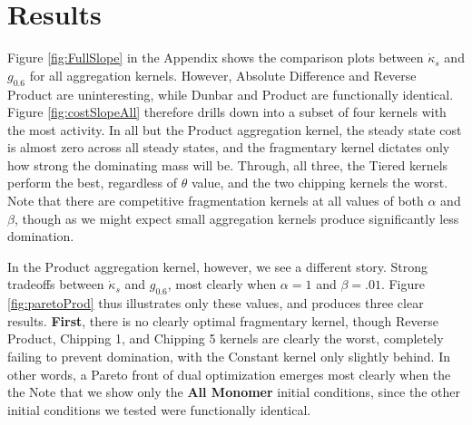 \documentclass[fleqn,10pt]{wlscirep}
\begin{document}
\vspace{0.5em}







\section{Results\label{sec:results}}
Figure \ref{fig:FullSlope} in the Appendix shows the comparison plots between $ \dot{\kappa}_s $ and $ g_{0.6} $ for all aggregation kernels.
However, \textcolor{abs}{Absolute Difference } and \textcolor{rprod}{Reverse Product} are uninteresting, while \textcolor{dunbar}{Dunbar} and \textcolor{product}{Product} are functionally identical.
Figure \ref{fig:costSlopeAll} therefore drills down into a subset of four kernels with the most activity.
In all but the  \textcolor{product}{Product}  aggregation kernel, the steady state cost is almost zero across all steady states, and the fragmentary kernel dictates only how strong the dominating mass will be.
Through, all three, the Tiered kernels perform the best, regardless of $ \theta $ value, and the two chipping kernels the worst.
Note that there are competitive fragmentation kernels at all values of both $ \alpha $ and $ \beta $, though as we might expect small aggregation kernels produce significantly less domination.


In the \textcolor{product}{Product} aggregation kernel, however, we see a different story.
Strong tradeoffs between $ \dot{\kappa}_s $ and $ g_{0.6} $, most clearly when $ \alpha = 1 $ and $ \beta = .01 $.
Figure \ref{fig:paretoProd} thus illustrates only these values, and produces three clear results.
\textbf{First}, there is no clearly optimal fragmentary kernel, though \textcolor{rprod}{Reverse Product}, \textcolor{chipping1}{Chipping 1}, and \textcolor{chipping5}{Chipping 5} kernels are clearly the worst, completely failing to prevent domination, with the \textcolor{constant}{Constant} kernel only slightly behind.
In other words, a Pareto front of dual optimization emerges most clearly when the the
Note that we show only the \textbf{All Monomer} initial conditions, since the other initial conditions we tested were functionally identical.
\end{document}
